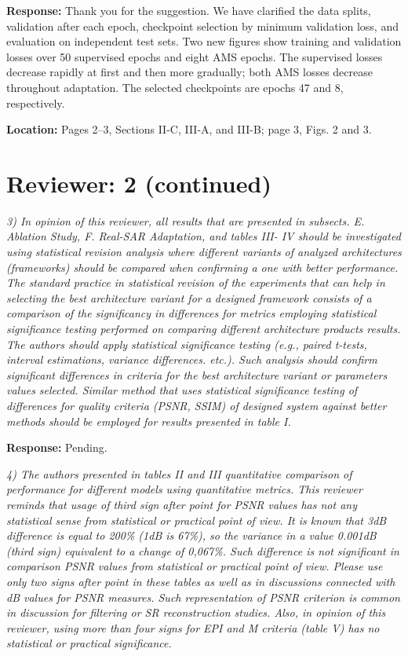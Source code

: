 \documentclass[11pt,letterpaper]{article}
\newcommand{\pendingnumberedcomment}[2]{%
  \Needspace{5\baselineskip}%
  \textit{#1 #2}\par
  {\small\textbf{Response:} Pending.}\par
  \vspace{6pt}%
}
\begin{document}
\textbf{Response:} Thank you for the suggestion. We have clarified the data splits, validation after each epoch, checkpoint selection by minimum validation loss, and evaluation on independent test sets. Two new figures show training and validation losses over 50 supervised epochs and eight AMS epochs. The supervised losses decrease rapidly at first and then more gradually; both AMS losses decrease throughout adaptation. The selected checkpoints are epochs 47 and 8, respectively.

\textbf{Location:} Pages 2--3, Sections II-C, III-A, and III-B; page 3, Figs. 2 and 3.

\clearpage
\section*{Reviewer: 2 (continued)}
\pendingnumberedcomment{3)}{In opinion of this reviewer, all results that are presented in subsects. E. Ablation Study, F. Real-SAR Adaptation, and tables III- IV should be investigated using statistical revision analysis where different variants of analyzed architectures (frameworks) should be compared when confirming a one with better performance. The standard practice in statistical revision of the experiments that can help in selecting the best architecture variant for a designed framework consists of a comparison of the significancy in differences for metrics employing statistical significance testing performed on comparing different architecture products\textasciiacute{} results. The authors should apply statistical significance testing (e.g., paired t-tests, interval estimations, variance differences. etc.). Such analysis should confirm significant differences in criteria for the best architecture variant or parameters\textasciiacute{} values selected. Similar method that uses statistical significance testing of differences for quality criteria (PSNR, SSIM) of designed system against better methods should be employed for results presented in table I.}

\textit{4) The authors presented in tables II and III quantitative comparison of performance for different models using quantitative metrics. This reviewer reminds that usage of third sign after point for PSNR values has not any statistical sense from statistical or practical point of view. It is known that 3dB difference is equal to 200\% (1dB is 67\%), so the variance in a value 0.001dB (third sign) equivalent to a change of 0,067\%. Such difference is not significant in comparison PSNR values from statistical or practical point of view. Please use only two signs after point in these tables as well as in discussions connected with dB values for PSNR measures. Such representation of PSNR criterion is common in discussion for filtering or SR reconstruction studies. Also, in opinion of this reviewer, using more than four signs for EPI and M criteria (table V) has no statistical or practical significance.}
\end{document}
